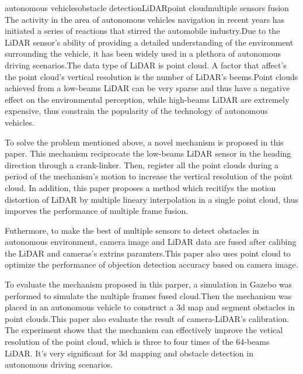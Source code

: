 
\begin{Eabstract}{autonomous vehicles}{obstacle detection}{LiDAR}{point cloud}{multiple sensors fusion}
The activity in the area of autonomous vehicles navigation in recent years has initiated a series of reactions that stirred the automobile industry.Due to the LiDAR sensor's ability of providing a detailed understanding of the environment surrounding the vehicle, it has been widely used in a plethora of autonomous driving scenarios.The data type of LiDAR is point cloud. A factor that affect's the point cloud's vertical resolution is the number of LiDAR's beems.Point clouds achieved from a low-beams LiDAR can be very sparse and thus have a negative effect on the environmental perception, while high-beams LiDAR are extremely expensive, thus constrain the popularity of the technology of autonomous vehicles.

To solve the problem mentioned above, a novel mechanism is proposed in this paper. This mechanism reciprocate the low-beams LiDAR sensor in the heading direction through a crank-linker. Then, register all the point clouds during a period of the mechanism's motion to increase the vertical resolution of the point cloud. In addition, this paper proposes a method which recitifys the motion distortion of LiDAR by multiple lineary interpolation in a single point cloud, thus imporves the performance of multiple frame fusion.

Futhermore, to make the best of multiple sensors to detect obstacles in autonomous environment, camera image and LiDAR data are fused after calibing the LiDAR and cameras's extrins paramters.This paper also uses point cloud to optimize the performance of objection detection accuracy based on camera image.

To evaluate the mechanism proposed in this parper, a simulation in Gazebo was performed to simulate the multiple frames fused cloud.Then the mechanism was placed in an autonomous vehicle to construct a 3d map and segment obstacles in point clouds.This paper also evaluate the result of camera-LiDAR's calibration. The experiment shows that the mechanism can effectively improve the vetical resolution of the point cloud, which is three to four times of the 64-beams LiDAR. It's very significant for 3d mapping and obstacle detection in autonomous driving scenarios.
\end{Eabstract}
